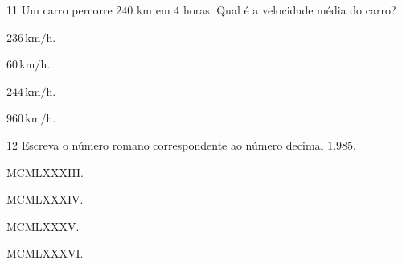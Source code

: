 

\num{11} Um carro percorre $240$ km em $4$ horas. Qual é a velocidade média do
carro?

\begin{escolha}
\item $236\,\text{km/h}$.
\item $60\,\text{km/h}$.
\item $244\,\text{km/h}$.
\item $960\,\text{km/h}$.
\end{escolha}



\num{12} Escreva o número romano correspondente ao número decimal $1.985$.

\begin{escolha}
\item MCMLXXXIII.
\item MCMLXXXIV.
\item MCMLXXXV.
\item MCMLXXXVI.
\end{escolha}



